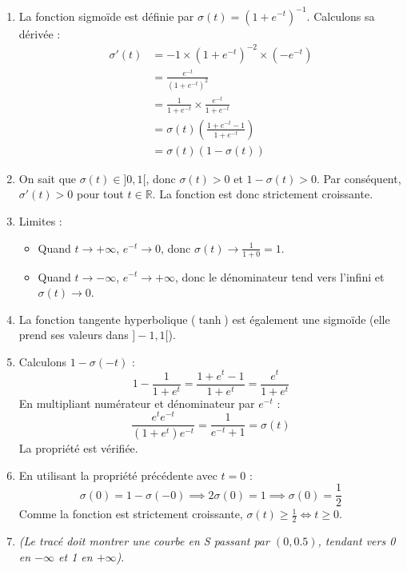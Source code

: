 \documentclass[solutions]{../exercices}
\begin{document}
\begin{solution}
    \begin{enumerate}
        \item La fonction sigmoïde est définie par $\sigma(t) = (1 + e^{-t})^{-1}$. Calculons sa dérivée :
        \begin{align*}
            \sigma'(t) &= -1 \times (1 + e^{-t})^{-2} \times (-e^{-t}) \\
                       &= \frac{e^{-t}}{(1 + e^{-t})^2} \\
                       &= \frac{1}{1 + e^{-t}} \times \frac{e^{-t}}{1 + e^{-t}} \\
                       &= \sigma(t) \left( \frac{1 + e^{-t} - 1}{1 + e^{-t}} \right) \\
                       &= \sigma(t) (1 - \sigma(t))
        \end{align*}

        \item On sait que $\sigma(t) \in ]0, 1[$, donc $\sigma(t) > 0$ et $1 - \sigma(t) > 0$.
        Par conséquent, $\sigma'(t) > 0$ pour tout $t \in \mathbb{R}$. La fonction est donc strictement croissante.

        \item Limites :
        \begin{itemize}
            \item Quand $t \to +\infty$, $e^{-t} \to 0$, donc $\sigma(t) \to \frac{1}{1+0} = 1$.
            \item Quand $t \to -\infty$, $e^{-t} \to +\infty$, donc le dénominateur tend vers l'infini et $\sigma(t) \to 0$.
        \end{itemize}

        \item La fonction tangente hyperbolique ($\tanh$) est également une sigmoïde (elle prend ses valeurs dans $]-1, 1[$).

        \item Calculons $1 - \sigma(-t)$ :
        \[
            1 - \frac{1}{1 + e^{t}} = \frac{1 + e^t - 1}{1 + e^t} = \frac{e^t}{1 + e^t}
        \]
        En multipliant numérateur et dénominateur par $e^{-t}$ :
        \[
            \frac{e^t e^{-t}}{(1 + e^t)e^{-t}} = \frac{1}{e^{-t} + 1} = \sigma(t)
        \]
        La propriété est vérifiée.

        \item En utilisant la propriété précédente avec $t=0$ :
        \[ \sigma(0) = 1 - \sigma(-0) \implies 2\sigma(0) = 1 \implies \sigma(0) = \frac{1}{2} \]
        Comme la fonction est strictement croissante, $\sigma(t) \ge \frac{1}{2} \iff t \ge 0$.

        \item \textit{(Le tracé doit montrer une courbe en S passant par $(0, 0.5)$, tendant vers 0 en $-\infty$ et 1 en $+\infty$)}.
    \end{enumerate}
\end{solution}
\end{document}
